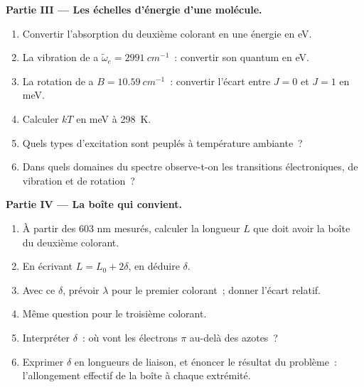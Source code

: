 \begin{problem}
\medskip\noindent\textbf{Partie III --- Les échelles d'énergie d'une molécule.}
\begin{enumerate}[resume]
  \item Convertir l'absorption du deuxième colorant en une énergie en eV.
  \item La vibration de  a $\tilde\omega_e = \qty{2991}{cm^{-1}}$~:
        convertir son quantum en eV.
  \item La rotation de  a $B = \qty{10.59}{cm^{-1}}$~: convertir
        l'écart entre $J = 0$ et $J = 1$ en meV.
  \item Calculer $kT$ en meV à \qty{298}{K}.
  \item Quels types d'excitation sont peuplés à température ambiante~?
  \item Dans quels domaines du spectre observe-t-on les transitions
        électroniques, de vibration et de rotation~?
\end{enumerate}

\medskip\noindent\textbf{Partie IV --- La boîte qui convient.}
\begin{enumerate}[resume]
  \item À partir des 603 nm mesurés, calculer la longueur $L$ que doit
        avoir la boîte du deuxième colorant.
  \item En écrivant $L = L_0 + 2\delta$, en déduire $\delta$.
  \item Avec ce $\delta$, prévoir $\lambda$ pour le premier colorant~;
        donner l'écart relatif.
  \item Même question pour le troisième colorant.
  \item Interpréter $\delta$~: où vont les électrons $\pi$ au-delà des
        azotes~?
  \item Exprimer $\delta$ en longueurs de liaison, et énoncer le résultat
        du problème~: l'allongement effectif de la boîte à chaque
        extrémité.
\end{enumerate}
\end{problem}
